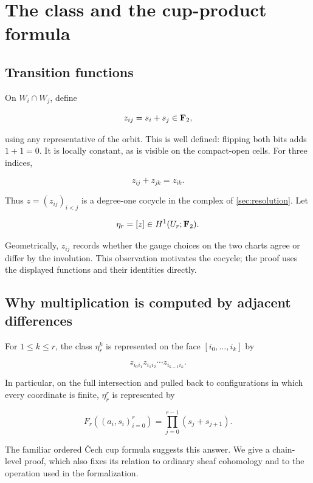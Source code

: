 \section{The class and the cup-product formula}
\label{sec:cup}

\subsection{Transition functions}

On \(W_i\cap W_j\), define

\[
z_{ij}=s_i+s_j\in\mathbf F_2,
\]

using any representative of the orbit. This is well defined: flipping
both bits adds \(1+1=0\). It is locally constant, as is visible on
the compact-open cells. For three indices,

\[
z_{ij}+z_{jk}=z_{ik}.
\]

Thus \(z=(z_{ij})_{i<j}\) is a degree-one cocycle in the complex
of \cref{sec:resolution}. Let

\[
\eta_r=[z]\in H^1(U_r;\mathbf F_2).
\]

Geometrically, \(z_{ij}\) records whether the gauge choices on the
two charts agree or differ by the involution. This observation
motivates the cocycle; the proof uses the displayed functions and
their identities directly.

\subsection{Why multiplication is computed by adjacent differences}

\begin{proposition}\label{prop:cup-formula}
For \(1\leq k\leq r\), the class \(\eta_r^k\) is represented on
the face \([i_0,\ldots,i_k]\) by

\[
z_{i_0i_1}z_{i_1i_2}\cdots z_{i_{k-1}i_k}.
\]

In particular, on the full intersection and pulled back to configurations
in which every coordinate is finite, \(\eta_r^r\) is represented by

\begin{equation}\label{eq:top-cochain}
F_r((a_i,s_i)_{i=0}^r)=\prod_{j=0}^{r-1}(s_j+s_{j+1}).
\end{equation}
\end{proposition}

The familiar ordered \v{C}ech cup formula suggests this answer. We give
a chain-level proof, which also fixes its relation to ordinary sheaf
cohomology and to the operation used in the formalization.

